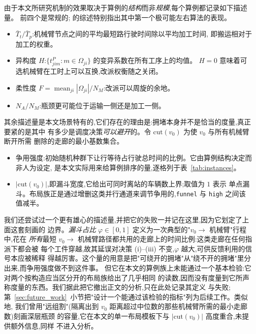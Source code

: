 \documentclass[manuscript,screen,review]{acmart}
\begin{document}
由于本文所研究机制的效果取决于算例的\emph{结构}而非\emph{规模},每个算例都记录如下描述量。
前四个是常规的;\cite{xin2025review} 的综述特别指出其中第一个极可能左右算法的表现。

\begin{itemize}[leftmargin=*,topsep=2pt,itemsep=1pt]
\item $\bar{T}_t/\bar{T}_p$:机械臂节点之间的平均最短路行驶时间除以平均加工时间,
即搬运相对于加工的权重。
\item 异构度 $H$:$\{t^P_{jim}: m\in\Omega_{ji}\}$ 的变异系数在所有工序上的均值。
$H=0$ 意味着可选机械臂在工时上可以互换,改派权衡随之关闭。
\item 柔性度 $F=\operatorname{mean}_{ji}|\Omega_{ji}|/N_M$:改派可以周旋的余地。
\item $N_A/N_M$:瓶颈更可能位于运输一侧还是加工一侧。
\end{itemize}

其余描述量是本文场景特有的,它们存在的理由是:拥堵本身并不是恰当的度量,真正要紧的是其中
有多少是调度决策\emph{可以避开}的。令 $\mathrm{cut}(v_0)$ 为使 $v_0$ 与所有机械臂断开所需
删除的走廊的最小基数集合。

\begin{itemize}[leftmargin=*,topsep=2pt,itemsep=1pt]
\item 争用强度:初始随机种群下让行等待占行驶总时间的比例。它由算例结构决定而非人为设定,
是本文实际用来给算例排序的量,逐格列于表~\ref{tab:instances}。
\item $|\mathrm{cut}(v_0)|$,即漏斗宽度,它给出可同时离站的车辆数上界;取值为 $1$ 表示
单点漏斗。布局族正是通过增删这类并行通道来调节争用的,\texttt{funnel} 与 \texttt{high}
之间该值减半。
\end{itemize}

我们还尝试过一个更有雄心的描述量,并把它的失败一并记在这里,因为它划定了上面这套刻画的
边界。\emph{漏斗占比} $\varphi\in[0,1]$ 定义为一次典型的"$v_0\to$ 机械臂"行程中,花在
\emph{所有}最短 $v_0\to$ 机械臂路径都共用的走廊上的时间比例:这类走廊在任何指派下都会被
每个工件穿越,故其延误对决策 (i)--(iii) 不变,$\varphi$ 越大,可供反馈利用的信号本应被稀释
得越厉害。这个量的用意是把"可绕开的拥堵"从"绕不开的拥堵"里分出来,而争用强度做不到这件事。
但它在本文的算例族上未能通过一个基本检验:它对两个按构造应当区分开的布局族给出了几乎相同
的读数,因而没有度量到它所声称度量的东西。我们据此把它撤出正文的分析,只在此处记录其定义
与失败;第~\ref{sec:future_work}~小节把"设计一个能通过该检验的指标"列为后续工作。类似地,
我们曾用"远组割"(隔离出到 $v_0$ 距离超过中位数的那些机械臂所需的最小走廊数)刻画深层瓶颈
的容量,它在本文的单一布局模板下与 $|\mathrm{cut}(v_0)|$ 高度重合,未提供额外信息,同样
不进入分析。
\end{document}
